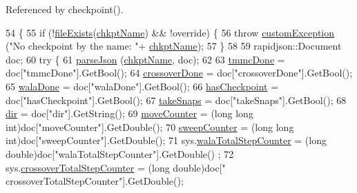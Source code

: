 Referenced by checkpoint().


\begin{DoxyCode}
54                                                           \{
55     \textcolor{keywordflow}{if} (!\hyperlink{utilities_8cpp_a9d1e3672fd331d4185c1763c80226307}{fileExists}(\hyperlink{classcheckpoint_a477eea21621f066889660ed426dc800f}{chkptName}) && !\textcolor{keyword}{override}) \{
56         \textcolor{keywordflow}{throw} \hyperlink{classcustom_exception}{customException} (\textcolor{stringliteral}{"No checkpoint by the name: "}+
      \hyperlink{classcheckpoint_a477eea21621f066889660ed426dc800f}{chkptName});
57     \}
58 
59     rapidjson::Document doc;
60     \textcolor{keywordflow}{try} \{
61         \hyperlink{utilities_8cpp_a3f494918ff3c252de4914c9905be04e7}{parseJson} (\hyperlink{classcheckpoint_a477eea21621f066889660ed426dc800f}{chkptName}, doc);
62 
63         \hyperlink{classcheckpoint_acbe0c62aa82735741a9f396827966823}{tmmcDone} = doc[\textcolor{stringliteral}{"tmmcDone"}].GetBool();
64         \hyperlink{classcheckpoint_a4f13612ea6d376bb327295bfce3a70c5}{crossoverDone} = doc[\textcolor{stringliteral}{"crossoverDone"}].GetBool();
65         \hyperlink{classcheckpoint_aab066479e2ca6656d0031dd46a2fc1a5}{walaDone} = doc[\textcolor{stringliteral}{"walaDone"}].GetBool();
66         \hyperlink{classcheckpoint_aa75f306fcb0c2360d948fa3a61adfed5}{hasCheckpoint} = doc[\textcolor{stringliteral}{"hasCheckpoint"}].GetBool();
67         \hyperlink{classcheckpoint_a685226e8bae8084937f73f65c326c362}{takeSnaps} = doc[\textcolor{stringliteral}{"takeSnaps"}].GetBool();
68         \hyperlink{classcheckpoint_a0e0f999ee8e0b09541e9131baa8a591d}{dir} = doc[\textcolor{stringliteral}{"dir"}].GetString();
69         \hyperlink{classcheckpoint_a5ab49a355714da4874aba00eb03f701d}{moveCounter} = (\textcolor{keywordtype}{long} \textcolor{keywordtype}{long} int)doc[\textcolor{stringliteral}{"moveCounter"}].GetDouble();
70         \hyperlink{classcheckpoint_ad011ddbca1ea708321335b1b3ac67e07}{sweepCounter} = (\textcolor{keywordtype}{long} \textcolor{keywordtype}{long} int)doc[\textcolor{stringliteral}{"sweepCounter"}].GetDouble();
71         sys.\hyperlink{classsim_system_a46f5d3a8843821b45fd3f4d9234a177f}{walaTotalStepCounter} = (\textcolor{keywordtype}{long} double)doc[\textcolor{stringliteral}{"walaTotalStepCounter"}].GetDouble()
      ;
72         sys.\hyperlink{classsim_system_a1d71d1df76bba70136853e30823d2db9}{crossoverTotalStepCounter} = (\textcolor{keywordtype}{long} double)doc[\textcolor{stringliteral}{"
      crossoverTotalStepCounter"}].GetDouble();

\end{DoxyCode}
